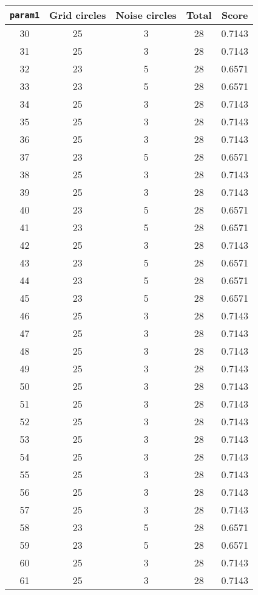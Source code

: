 \documentclass[letterpaper, 12pt]{article}
\begin{document}
\begin{longtable}{|c|c|c|c|c|}
\hline
\textbf{\texttt{param1}} & \textbf{Grid circles} & \textbf{Noise circles} & \textbf{Total} & \textbf{Score} \\
\hline
30 & 25 & 3 & 28 & 0.7143 \\
\hline
31 & 25 & 3 & 28 & 0.7143 \\
\hline
32 & 23 & 5 & 28 & 0.6571 \\
\hline
33 & 23 & 5 & 28 & 0.6571 \\
\hline
34 & 25 & 3 & 28 & 0.7143 \\
\hline
35 & 25 & 3 & 28 & 0.7143 \\
\hline
36 & 25 & 3 & 28 & 0.7143 \\
\hline
37 & 23 & 5 & 28 & 0.6571 \\
\hline
38 & 25 & 3 & 28 & 0.7143 \\
\hline
39 & 25 & 3 & 28 & 0.7143 \\
\hline
40 & 23 & 5 & 28 & 0.6571 \\
\hline
41 & 23 & 5 & 28 & 0.6571 \\
\hline
42 & 25 & 3 & 28 & 0.7143 \\
\hline
43 & 23 & 5 & 28 & 0.6571 \\
\hline
44 & 23 & 5 & 28 & 0.6571 \\
\hline
45 & 23 & 5 & 28 & 0.6571 \\
\hline
46 & 25 & 3 & 28 & 0.7143 \\
\hline
47 & 25 & 3 & 28 & 0.7143 \\
\hline
48 & 25 & 3 & 28 & 0.7143 \\
\hline
49 & 25 & 3 & 28 & 0.7143 \\
\hline
50 & 25 & 3 & 28 & 0.7143 \\
\hline
51 & 25 & 3 & 28 & 0.7143 \\
\hline
52 & 25 & 3 & 28 & 0.7143 \\
\hline
53 & 25 & 3 & 28 & 0.7143 \\
\hline
54 & 25 & 3 & 28 & 0.7143 \\
\hline
55 & 25 & 3 & 28 & 0.7143 \\
\hline
56 & 25 & 3 & 28 & 0.7143 \\
\hline
57 & 25 & 3 & 28 & 0.7143 \\
\hline
58 & 23 & 5 & 28 & 0.6571 \\
\hline
59 & 23 & 5 & 28 & 0.6571 \\
\hline
60 & 25 & 3 & 28 & 0.7143 \\
\hline
61 & 25 & 3 & 28 & 0.7143 \\

\end{longtable}
\end{document}

